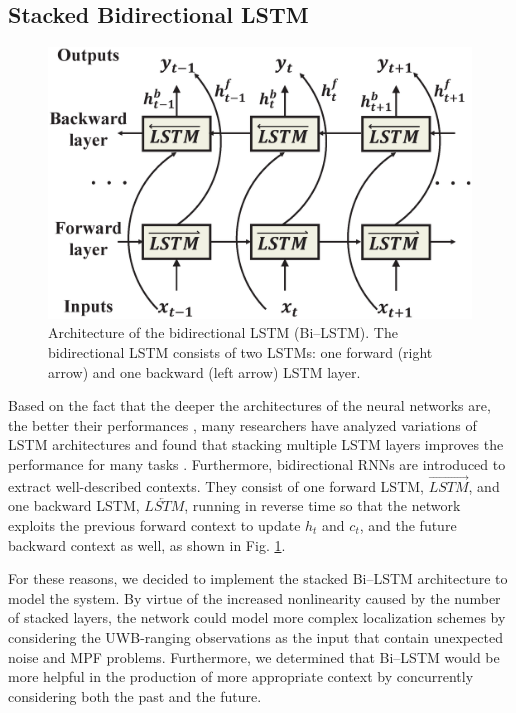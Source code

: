 \documentclass[letterpaper, 10 pt, conference]{ieeeconf}
\begin{document}
\subsection{Stacked Bidirectional LSTM}

\begin{figure}[h!]
	\centering
	\includegraphics[width=.9\linewidth]{image/bidirectional_LSTM}
	\caption{Architecture of the bidirectional LSTM (Bi--LSTM). The bidirectional LSTM consists of two LSTMs: one forward (right arrow) and one backward (left arrow) LSTM layer.}
	
	\label{fig:bidirectional_revised}	
\end{figure}

Based on the fact that the deeper the architectures of the neural networks are, the better their performances \cite{simonyan2014very, he2016deep}, many researchers have analyzed variations of LSTM architectures and found that stacking multiple LSTM layers improves the performance for many tasks \cite{graves2013hybrid, graves2013speech, ullah2018action}. Furthermore, bidirectional RNNs are introduced \cite{schuster1997bidirectional} to extract well-described contexts. They consist of one forward LSTM, $\overrightarrow{LSTM}$, and one backward LSTM, $\overleftarrow{LSTM}$, running in reverse time so that the network exploits the previous forward context to update $h_{t}$ and $c_{t}$, and the future backward context as well, as shown in Fig. \ref{fig:bidirectional_revised}. 

For these reasons, we decided to implement the stacked Bi--LSTM architecture to model the system. By virtue of the increased nonlinearity caused by the number of stacked layers, the network could model more complex localization schemes by considering the UWB-ranging observations as the input that contain unexpected noise and MPF problems. Furthermore, we determined that Bi--LSTM would be more helpful in the production of more appropriate context by concurrently considering both the past and the future.
\end{document}
